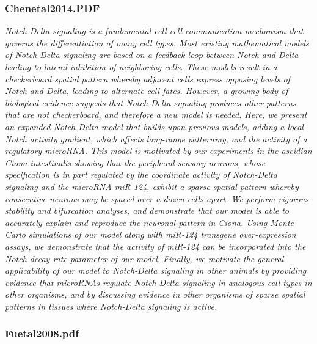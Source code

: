 \documentclass[graybox]{svmult}
\begin{document}
\subsubsection{Chenetal2014.PDF}
\cite{Chen2014}
\textit{Notch-Delta signaling is a fundamental cell-cell communication mechanism 
that governs the differentiation of many cell types. Most existing mathematical 
models of Notch-Delta signaling are based on a feedback loop between Notch and 
Delta leading to lateral inhibition of neighboring cells. These models result in 
a checkerboard spatial pattern whereby adjacent cells express opposing levels of 
Notch and Delta, leading to alternate cell fates. However, a growing body of 
biological evidence suggests that Notch-Delta signaling produces other patterns 
that are not checkerboard, and therefore a new model is needed. Here, we present 
an expanded Notch-Delta model that builds upon previous models, adding a local 
Notch activity gradient, which affects long-range patterning, and the activity 
of a regulatory microRNA. This model is motivated by our experiments in the 
ascidian Ciona intestinalis showing that the peripheral sensory neurons, whose 
specification is in part regulated by the coordinate activity of Notch-Delta 
signaling and the microRNA miR-124, exhibit a sparse spatial pattern whereby 
consecutive neurons may be spaced over a dozen cells apart. We perform rigorous 
stability and bifurcation analyses, and demonstrate that our model is able to 
accurately explain and reproduce the neuronal pattern in Ciona. Using Monte 
Carlo simulations of our model along with miR-124 transgene over-expression 
assays, we demonstrate that the activity of miR-124 can be incorporated into the 
Notch decay rate parameter of our model. Finally, we motivate the general 
applicability of our model to Notch-Delta signaling in other animals by 
providing evidence that microRNAs regulate Notch-Delta signaling in analogous 
cell types in other organisms, and by discussing evidence in other organisms of 
sparse spatial patterns in tissues where Notch-Delta signaling is active.}

\subsubsection{Fuetal2008.pdf}
\end{document}
